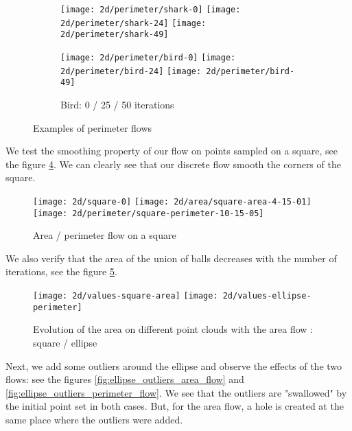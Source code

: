 \begin{figure}[h]
    \centering

    \begin{subfigure}[b]{\textwidth}
        \texttt{[image: 2d/perimeter/shark-0]}
        \texttt{[image: 2d/perimeter/shark-24]}
        \texttt{[image: 2d/perimeter/shark-49]}
        \label{fig:shark_perimeter_flow}
    \end{subfigure}

    \begin{subfigure}[b]{\textwidth}
        \texttt{[image: 2d/perimeter/bird-0]}
        \texttt{[image: 2d/perimeter/bird-24]}
        \texttt{[image: 2d/perimeter/bird-49]}
        \caption{Bird: 0 / 25 / 50 iterations}
        \label{fig:bird_perimeter_flow}
    \end{subfigure}

    \caption{Examples of perimeter flows}
\end{figure}

We test the smoothing property of our flow on points sampled on a square, see
the figure \ref{fig:area_perimeter_flow_square}. We can clearly see that our
discrete flow smooth the corners of the square.

\begin{figure}[h]
    \centering
    \texttt{[image: 2d/square-0]}
    \texttt{[image: 2d/area/square-area-4-15-01]}
    \texttt{[image: 2d/perimeter/square-perimeter-10-15-05]}
    \caption{Area / perimeter flow on a square}
    \label{fig:area_perimeter_flow_square}
\end{figure}

We also verify that the area of the union of balls decreases with the number of
iterations, see the figure \ref{fig:area_time_decrease}.

\begin{figure}[h]
    \centering
    \texttt{[image: 2d/values-square-area]}
    \texttt{[image: 2d/values-ellipse-perimeter]}
    \caption{Evolution of the area on different point clouds with the area
        flow : square / ellipse}
    \label{fig:area_time_decrease}
\end{figure}

Next, we add some outliers around the ellipse and observe the effects of the two
flows: see the figures \ref{fig:ellipse_outliers_area_flow} and
\ref{fig:ellipse_outliers_perimeter_flow}. We see that the outliers are
"swallowed" by the initial point set in both cases. But, for the area flow, a
hole is created at the same place where the outliers were added.

